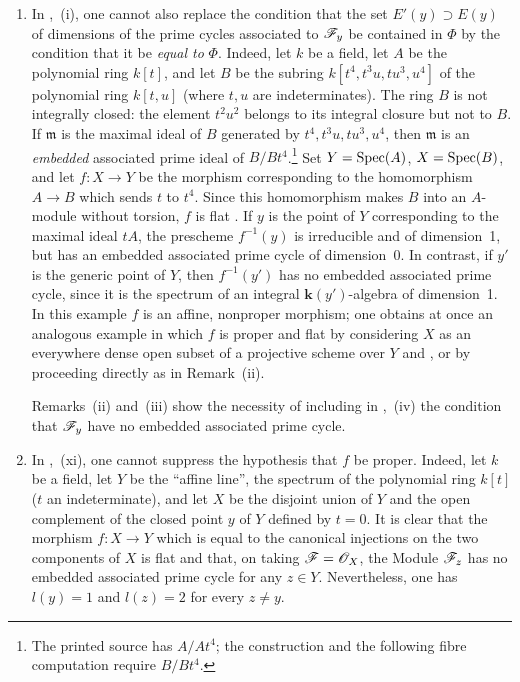 \begin{remarks}[12.2.3]
\begin{enumerate}[label=(\roman*)]
  \item In ,~(i), one cannot also replace the condition that the set $E'(y)\supset E(y)$ of dimensions of the prime cycles associated to $\mathscr{F}_y$ be contained in $\Phi$ by the condition that it be \emph{equal to} $\Phi$.
Indeed, let $k$ be a field, let $A$ be the polynomial ring $k[t]$, and let $B$ be the subring $k[t^4,t^3u,tu^3,u^4]$ of the polynomial ring $k[t,u]$ (where $t,u$ are indeterminates). The ring $B$ is not integrally closed: the element $t^2u^2$ belongs to its integral closure but not to $B$. If $\mathfrak{m}$ is the maximal ideal of $B$ generated by $t^4,t^3u,tu^3,u^4$, then $\mathfrak{m}$ is an \emph{embedded} associated prime ideal of $B/Bt^4$.\footnote{The printed source has $A/At^4$; the construction and the following fibre computation require $B/Bt^4$.}
Set $Y=\operatorname{Spec}(A)$, $X=\operatorname{Spec}(B)$, and let $f:X\to Y$ be the morphism corresponding to the homomorphism $A\to B$ which sends $t$ to $t^4$.
Since this homomorphism makes $B$ into an $A$-module without torsion, $f$ is flat .
If $y$ is the point of $Y$ corresponding to the maximal ideal $tA$, the prescheme $f^{-1}(y)$ is irreducible and of dimension~1, but has an embedded associated prime cycle of dimension~0. In contrast, if $y'$ is the generic point of $Y$, then $f^{-1}(y')$ has no embedded associated prime cycle, since it is the spectrum of an integral $\boldsymbol{k}(y')$-algebra of dimension~1. In this example $f$ is an affine, nonproper morphism; one obtains at once an analogous example in which $f$ is proper and flat by considering $X$ as an everywhere dense open subset of a projective scheme over $Y$  and , or by proceeding directly as in Remark~(ii).

Remarks~(ii) and~(iii) show the necessity of including in ,~(iv) the condition that $\mathscr{F}_y$ have no embedded associated prime cycle.

  \item In ,~(xi), one cannot suppress the hypothesis that $f$ be proper.
Indeed, let $k$ be a field, let $Y$ be the ``affine line'', the spectrum of the polynomial ring $k[t]$ ($t$ an indeterminate), and let $X$ be the disjoint union of $Y$ and the open complement of the closed point $y$ of $Y$ defined by $t=0$. It is clear that the morphism $f:X\to Y$ which is equal to the canonical injections on the two components of $X$ is flat and that, on taking $\mathscr{F}=\mathscr{O}_X$, the Module $\mathscr{F}_z$ has no embedded associated prime cycle for any $z\in Y$. Nevertheless, one has $l(y)=1$ and $l(z)=2$ for every $z\neq y$.


\end{enumerate}
\end{remarks}

